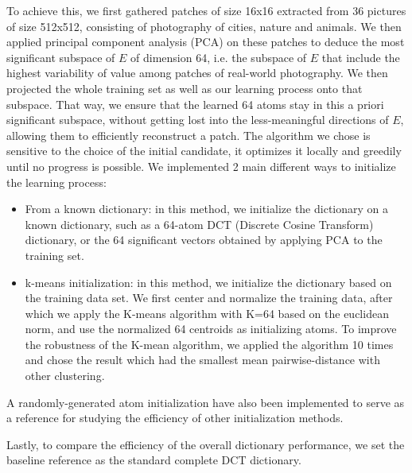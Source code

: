 To achieve this, we first gathered patches of size 16x16 extracted from 36 pictures of size 512x512, consisting of photography of cities, nature and animals. We then applied principal component analysis (PCA) on these patches to deduce the most significant subspace of $E$ of dimension 64, i.e. the subspace of $E$ that include the highest variability of value among patches of real-world photography. We then projected the whole training set as well as our learning process onto that subspace. That way, we ensure that the learned 64 atoms stay in this a priori significant subspace, without getting lost into the less-meaningful directions of $E$, allowing them to efficiently reconstruct a patch.
The algorithm we chose is sensitive to the choice of the initial candidate, it optimizes it locally and greedily until no progress is possible. We implemented 2 main different ways to initialize the learning process:
\begin{itemize}
   \item From a known dictionary: in this method, we initialize the dictionary on a known dictionary, such as a 64-atom DCT (Discrete Cosine Transform) dictionary, or the 64 significant vectors obtained by applying PCA to the training set.  
   \item k-means initialization: in this method, we initialize the dictionary based on the training data set. We first center and normalize the training data, after which we apply the K-means algorithm with K=64 based on the euclidean norm, and use the normalized 64 centroids as initializing atoms. To improve the robustness of the K-mean algorithm, we applied the algorithm 10 times and chose the result which had the smallest mean pairwise-distance with other clustering. 
\end{itemize}
A randomly-generated atom initialization have also been implemented to serve as a reference for studying the efficiency of other initialization methods. 

Lastly, to compare the efficiency of the overall dictionary performance, we set the baseline reference as the standard complete DCT dictionary.